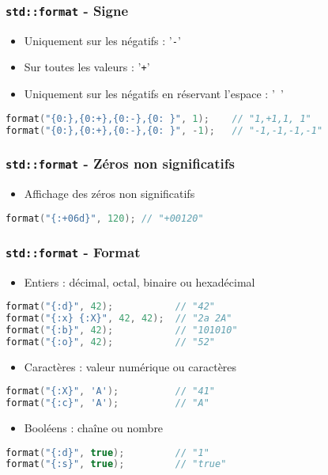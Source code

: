 \documentclass[C++.tex]{subfiles}
\begin{document}
\begin{frame}[fragile]
	\frametitle{\lstinline|std::format| - Signe}
	\begin{itemize}
		\item Uniquement sur les négatifs : '\lstinline|-|'


		\item Sur toutes les valeurs : '\lstinline|+|'
		\item Uniquement sur les négatifs en réservant l'espace : '\lstinline| |'
	\end{itemize}

	\begin{lstlisting}[language=C++]
format("{0:},{0:+},{0:-},{0: }", 1); 	// "1,+1,1, 1"
format("{0:},{0:+},{0:-},{0: }", -1);	// "-1,-1,-1,-1"\end{lstlisting}
\end{frame}

\begin{frame}[fragile]
	\frametitle{\lstinline|std::format| - Zéros non significatifs}
	\begin{itemize}
		\item Affichage des zéros non significatifs
	\end{itemize}

	\begin{lstlisting}[language=C++]
format("{:+06d}", 120);	// "+00120"\end{lstlisting}
\end{frame}

\begin{frame}[fragile]
	\frametitle{\lstinline|std::format| - Format}
	\begin{itemize}
		\item Entiers : décimal, octal, binaire ou hexadécimal
	\end{itemize}

	\begin{lstlisting}[language=C++]
format("{:d}", 42);           // "42"
format("{:x} {:X}", 42, 42);  // "2a 2A"
format("{:b}", 42);           // "101010"
format("{:o}", 42);           // "52"\end{lstlisting}

	\begin{itemize}
		\item Caractères : valeur numérique ou caractères
	\end{itemize}

	\begin{lstlisting}[language=C++]
format("{:X}", 'A');          // "41"
format("{:c}", 'A');          // "A"\end{lstlisting}

	\begin{itemize}
		\item Booléens : chaîne ou nombre
	\end{itemize}

	\begin{lstlisting}[language=C++]
format("{:d}", true);         // "1"
format("{:s}", true);         // "true"\end{lstlisting}
\end{frame}
\end{document}
